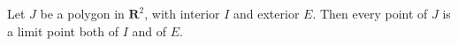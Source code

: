 Let $J$ be a polygon in $\mathbf{R}^2$, with interior $I$ and exterior $E$. Then every point of $J$ is a limit point both of $I$ and of $E$.
